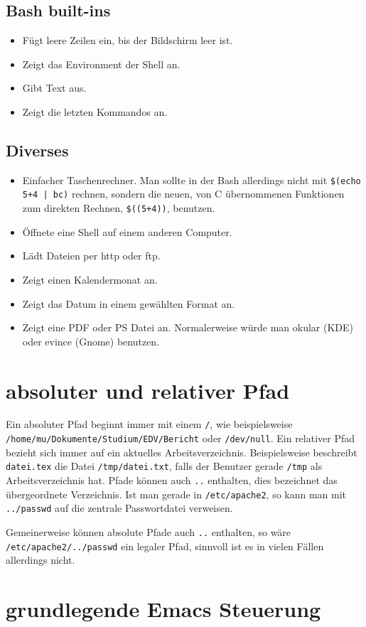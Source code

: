 \documentclass[12pt]{report}
\newcommand\dd[2]{\item[\texttt{#1}] #2}
\begin{document}
\subsection{Bash built-ins}
\begin{itemize}
\dd{clear}{Fügt leere Zeilen ein, bis der Bildschirm leer ist.}
\dd{set}{Zeigt das Environment der Shell an.}
\dd{echo}{Gibt Text aus.}
\dd{history}{Zeigt die letzten Kommandos an.}
\end{itemize}

\subsection{Diverses}
\begin{itemize}
\dd{bc}{Einfacher Taschenrechner. Man sollte in der Bash allerdings nicht mit \texttt{\$(echo 5+4 | bc)} rechnen, sondern die neuen, von C übernommenen Funktionen zum direkten Rechnen, \texttt{\$((5+4))}, benutzen.}
\dd{ssh}{Öffnete eine Shell auf einem anderen Computer.}
\dd{wget}{Lädt Dateien per http oder ftp.}
\dd{cal}{Zeigt einen Kalendermonat an.}
\dd{date}{Zeigt das Datum in einem gewählten Format an.}
\dd{gv}{Zeigt eine PDF oder PS Datei an. Normalerweise würde man okular (KDE) oder evince (Gnome) benutzen.}
\end{itemize}

\section{absoluter und relativer Pfad}

Ein absoluter Pfad beginnt immer mit einem \texttt{/}, wie beispielsweise \\ \texttt{/home/mu/Dokumente/Studium/EDV/Bericht} oder \texttt{/dev/null}. Ein relativer Pfad bezieht sich immer auf ein aktuelles Arbeitsverzeichnis. Beispielsweise beschreibt \texttt{datei.tex} die Datei \texttt{/tmp/datei.txt}, falls der Benutzer gerade \texttt{/tmp} als Arbeitsverzeichnis hat. Pfade können auch \texttt{..} enthalten, dies bezeichnet das übergeordnete Verzeichnis. Ist man gerade in \texttt{/etc/apache2}, so kann man mit \texttt{../passwd} auf die zentrale Passwortdatei verweisen.

Gemeinerweise können absolute Pfade auch \texttt{..} enthalten, so wäre \\
\texttt{/etc/apache2/../passwd} ein legaler Pfad, sinnvoll ist es in vielen Fällen allerdings nicht.

\section{grundlegende Emacs Steuerung}
\end{document}
